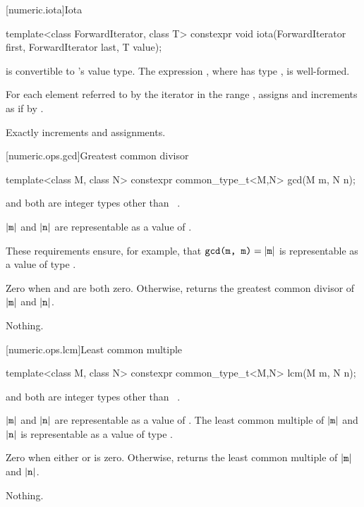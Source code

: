 [numeric.iota]{Iota}

%
\begin{itemdecl}
template<class ForwardIterator, class T>
  constexpr void iota(ForwardIterator first, ForwardIterator last, T value);
\end{itemdecl}

\begin{itemdescr}
\pnum
\mandates
{} is convertible to 's value type.
The expression , where  has type ,
is well-formed.

\pnum
\effects
For each element referred to by the iterator 
in the range ,
assigns  and increments 
as if by .

\pnum
\complexity
Exactly  increments and assignments.
\end{itemdescr}

[numeric.ops.gcd]{Greatest common divisor}

%
\begin{itemdecl}
template<class M, class N>
  constexpr common_type_t<M,N> gcd(M m, N n);
\end{itemdecl}

\begin{itemdescr}
\pnum
\mandates
{} and  both are integer types other than
\cv{}~.

\pnum
\expects
$|\texttt{m}|$ and $|\texttt{n}|$
are representable as a value of .
\begin{note}
These requirements ensure, for example,
that $\texttt{gcd(m, m)} = |\texttt{m}|$
is representable as a value of type .
\end{note}


\pnum
\returns
Zero when  and  are both zero. Otherwise,
returns the greatest common divisor of $|\texttt{m}|$ and $|\texttt{n}|$.

\pnum
\throws
Nothing.
\end{itemdescr}

[numeric.ops.lcm]{Least common multiple}

%
\begin{itemdecl}
template<class M, class N>
  constexpr common_type_t<M,N> lcm(M m, N n);
\end{itemdecl}

\begin{itemdescr}
\pnum
\mandates
{} and  both are integer types other than
\cv{}~.

\pnum
\expects
$|\texttt{m}|$ and $|\texttt{n}|$
are representable as a value of .
The least common multiple of $|\texttt{m}|$ and $|\texttt{n}|$
is representable as a value of type .


\pnum
\returns
Zero when either  or  is zero.
Otherwise, returns the least common multiple of $|\texttt{m}|$ and $|\texttt{n}|$.

\pnum
\throws
Nothing.
\end{itemdescr}

